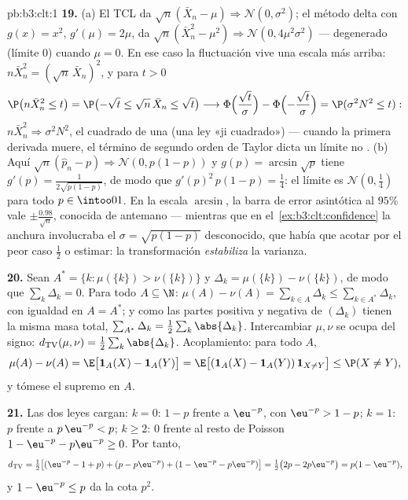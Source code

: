 \begin{solution}{pb:b3:clt:1}
\textbf{19.} (a) El TCL da $\sqrt n(\bar X_n - \mu)
\Rightarrow \mathcal N(0, \sigma^2)$; el método delta con $g(x) = x^2$,
$g'(\mu) = 2\mu$, da $\sqrt n(\bar
X_n^2 - \mu^2) \Rightarrow \mathcal N(0, 4\mu^2\sigma^2)$ --- degenerado
(límite $0$) cuando $\mu = 0$. En ese caso la fluctuación vive una
escala más arriba: $n\bar X_n^2 =
(\sqrt n\,\bar X_n)^2$, y para $t > 0$
\[
\P\bigl(n\bar X_n^2 \leq t\bigr) = \P\bigl(-\sqrt t \leq
\sqrt n\,\bar X_n \leq \sqrt t\bigr) \longrightarrow
\Phi\Bigl(\frac{\sqrt t}\sigma\Bigr) -
\Phi\Bigl(-\frac{\sqrt t}\sigma\Bigr) = \P(\sigma^2N^2
\leq t) :
\]
$n\bar X_n^2 \Rightarrow \sigma^2N^2$, el cuadrado de una
 (una ley «ji cuadrado»)
--- cuando la primera derivada muere, el término de segundo orden de
Taylor dicta un límite no .
(b) Aquí $\sqrt n(\hat p_n - p)
\Rightarrow \mathcal N(0, p(1 - p))$ y $g(p) =
\arcsin\sqrt p$ tiene $g'(p) = \frac1{2\sqrt{p(1 - p)}}$, de modo que
$g'(p)^2\,p(1 - p) = \frac14$: el límite es $\mathcal
N(0, \frac14)$ para todo $p \in \intoo01$. En la escala $\arcsin$, la
barra de error asintótica al $95\%$ vale $\pm
\frac{0.98}{\sqrt n}$, conocida de antemano --- mientras que en
el~\cref{ex:b3:clt:confidence} la anchura involucraba el
$\sigma = \sqrt{p(1-p)}$ desconocido, que había que acotar por el peor
caso $\frac12$ o estimar: la transformación \emph{estabiliza} la
varianza.

\textbf{20.} Sean $A^* = \{k : \mu(\{k\}) > \nu(\{k\})\}$ y
$\Delta_k = \mu(\{k\}) - \nu(\{k\})$, de modo que $\sum_k\Delta_k = 0$.
Para todo $A \subseteq \N$: $\mu(A) -
\nu(A) = \sum_{k\in A}\Delta_k \leq \sum_{k\in
A^*}\Delta_k$, con igualdad en $A = A^*$; y como las partes positiva y
negativa de $(\Delta_k)$ tienen la misma masa total,
$\sum_{A^*}\Delta_k =
\frac12\sum_k\abs{\Delta_k}$. Intercambiar $\mu, \nu$ se ocupa del
signo: $d_{\mathrm{TV}}(\mu, \nu) =
\frac12\sum_k\abs{\Delta_k}$. Acoplamiento: para todo $A$,
\[
\mu(A) - \nu(A) = \E\bigl[\mathbf 1_A(X) - \mathbf
1_A(Y)\bigr] = \E\bigl[(\mathbf 1_A(X) - \mathbf
1_A(Y))\,\mathbf 1_{X\neq Y}\bigr] \leq \P(X \neq Y),
\]
y tómese el supremo en $A$.

\textbf{21.} Las dos leyes cargan: $k = 0$: $1 - p$ frente a $\eu^{-p}$,
con $\eu^{-p} > 1 - p$; $k = 1$: $p$ frente a $p\,\eu^{-p} < p$;
$k \geq 2$: $0$ frente al resto de Poisson
$1 - \eu^{-p} - p\eu^{-p} \geq 0$. Por tanto,
\[
d_{\mathrm{TV}} = \tfrac12\bigl[(\eu^{-p} - 1 + p) + (p -
p\eu^{-p}) + (1 - \eu^{-p} - p\eu^{-p})\bigr] =
\tfrac12\bigl(2p - 2p\eu^{-p}\bigr) = p(1 - \eu^{-p}),
\]
y $1 - \eu^{-p} \leq p$ da la cota $p^2$.


\end{solution}
